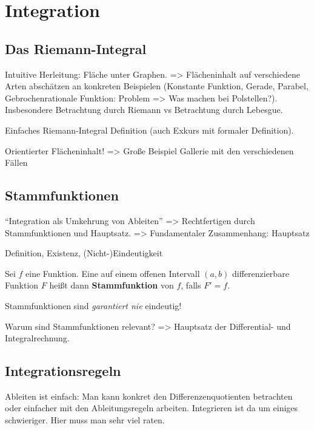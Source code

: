\chapter{Integration}

\section{Das Riemann-Integral}
Intuitive Herleitung: Fläche unter Graphen. => Flächeninhalt auf verschiedene Arten abschätzen an konkreten Beispielen (Konstante Funktion, Gerade, Parabel, Gebrochenrationale Funktion: Problem => Was machen bei Polstellen?). Insbesondere Betrachtung durch Riemann vs Betrachtung durch Lebesgue. 

Einfaches Riemann-Integral Definition (auch Exkurs mit formaler Definition). 

Orientierter Flächeninhalt! => Große Beispiel Gallerie mit den verschiedenen Fällen

\section{Stammfunktionen}
"`Integration als Umkehrung von Ableiten"' => Rechtfertigen durch Stammfunktionen und Hauptsatz. => Fundamentaler Zusammenhang: Hauptsatz

Definition, Existenz, (Nicht-)Eindeutigkeit

\begin{definition}
    Sei \(f\) eine Funktion. Eine auf einem offenen Intervall \((a,b)\) differenzierbare Funktion \(F\) heißt dann \textbf{Stammfunktion} von \(f\), falls \(F' = f\). 
\end{definition}

Stammfunktionen sind \textit{garantiert nie} eindeutig!
\begin{example}
    
\end{example}

Warum sind Stammfunktionen relevant? => Hauptsatz der Differential- und Integralrechnung. 

\begin{theorem}
    
\end{theorem}

\section{Integrationsregeln}
Ableiten ist einfach: Man kann konkret den Differenzenquotienten betrachten oder einfacher mit den Ableitungsregeln arbeiten. Integrieren ist da um einiges schwieriger. Hier muss man sehr viel raten. 

